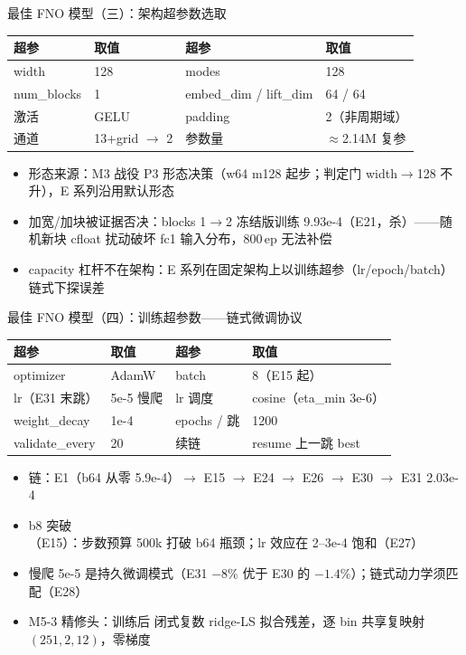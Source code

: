 \documentclass[aspectratio=169]{beamer}
\newcommand{\pos}[1]{\textcolor{blue!70!black}{#1}}
\newcommand{\con}[1]{\textcolor{orange!85!black}{#1}}
\begin{document}
\begin{frame}{最佳 FNO 模型（三）：架构超参数选取}
  \begin{table}
    \centering
    \begin{tabular}{llll}
      \toprule
      超参 & 取值 & 超参 & 取值 \\
      \midrule
      width & \pos{128} & modes & \pos{128} \\
      num\_blocks & \pos{1} & embed\_dim / lift\_dim & 64 / 64 \\
      激活 & GELU & padding & 2（非周期域） \\
      通道 & 13+grid $\to$ 2 & 参数量 & $\approx$2.14M 复参 \\
      \bottomrule
    \end{tabular}
  \end{table}
  \begin{itemize}
    \item 形态来源：M3 战役 \pos{P3 形态决策}（w64 m128 起步；判定门 width$\to$128 不升），E 系列沿用默认形态
    \item \pos{加宽/加块被证据否决}：blocks 1$\to$2 冻结版训练 \con{9.93e-4（E21，杀）}——随机新块 cfloat 扰动破坏 fc1 输入分布，800\,ep 无法补偿
    \item \con{capacity 杠杆不在架构}：E 系列在固定架构上以训练超参（lr/epoch/batch）链式下探误差
  \end{itemize}
\end{frame}

\begin{frame}{最佳 FNO 模型（四）：训练超参数——链式微调协议}
  \begin{table}
    \centering
    \small
    \begin{tabular}{llll}
      \toprule
      超参 & 取值 & 超参 & 取值 \\
      \midrule
      optimizer & AdamW & batch & 8（E15 起） \\
      lr（E31 末跳） & \pos{5e-5 慢爬} & lr 调度 & cosine（eta\_min 3e-6） \\
      weight\_decay & 1e-4 & epochs / 跳 & 1200 \\
      validate\_every & 20 & 续链 & resume 上一跳 best \\
      \bottomrule
    \end{tabular}
  \end{table}
  \begin{itemize}
    \item 链：E1（b64 从零 5.9e-4）$\to$ E15 $\to$ E24 $\to$ E26 $\to$ E30 $\to$ \pos{E31 2.03e-4}
    \item \pos{b8 突破}（E15）：步数预算 500k 打破 b64 瓶颈；lr 效应在 2--3e-4 饱和（E27）
    \item \pos{慢爬 5e-5 是持久微调模式}（E31 $-8\%$ 优于 E30 的 $-1.4\%$）；链式动力学须匹配（E28）
    \item M5-3 精修头：训练后 \pos{闭式复数 ridge-LS} 拟合残差，逐 bin 共享复映射 $(251,2,12)$，零梯度
  \end{itemize}
\end{frame}
\end{document}

